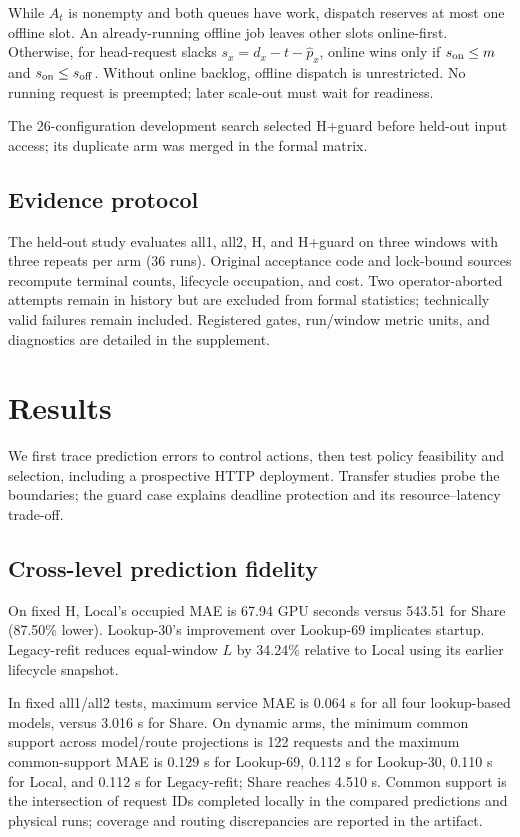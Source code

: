 While $A_t$ is nonempty and both queues have work, dispatch reserves at most
one offline slot. An already-running offline job leaves other slots online-first.
Otherwise, for head-request slacks $s_x=d_x-t-\widehat{p}_x$, online wins
only if $s_{\rm on}\leq m$ and $s_{\rm on}\leq s_{\rm off}$.
Without online backlog, offline dispatch is unrestricted. No running request
is preempted; later scale-out must wait for readiness.

The 26-configuration development search selected H+guard before held-out
input access; its duplicate arm was merged in the formal matrix.

\subsection{Evidence protocol}
The held-out study evaluates all1, all2, H, and H+guard on three windows
with three repeats per arm (36 runs). Original acceptance code and lock-bound
sources recompute terminal counts, lifecycle occupation, and cost. Two
operator-aborted attempts remain in history but are excluded from formal statistics;
technically valid failures remain included. Registered gates, run/window metric
units, and diagnostics are detailed in the supplement.

\section{Results}
\label{sec:v3results}
We first trace prediction errors to control actions, then test policy
feasibility and selection, including a prospective HTTP deployment. Transfer
studies probe the boundaries; the guard case explains deadline protection
and its resource--latency trade-off.
\subsection{Cross-level prediction fidelity}
\label{sec:crosslevel}
On fixed H, Local's occupied MAE is 67.94 GPU seconds versus 543.51 for Share
(87.50\% lower). Lookup-30's improvement over Lookup-69 implicates startup.
Legacy-refit reduces equal-window $L$ by 34.24\% relative to Local using
its earlier lifecycle snapshot.

In fixed all1/all2 tests, maximum service MAE is 0.064 s for all four
lookup-based models, versus 3.016 s for Share. On dynamic arms, the
minimum common support across model/route projections is 122 requests and the
maximum common-support MAE is 0.129 s for Lookup-69, 0.112 s for Lookup-30, 0.110 s for Local, and
0.112 s for Legacy-refit; Share reaches 4.510 s. Common support is the intersection of request
IDs completed locally in the compared predictions and physical runs; coverage
and routing discrepancies are reported in the artifact.

